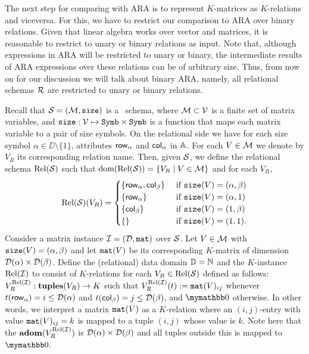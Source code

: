 The next step for comparing \langsum with ARA is to represent $K$-matrices as $K$-relations and viceversa. For this, we have to restrict our comparison to ARA over binary relations. Given that linear algebra works over vector and matrices, it is reasonable to restrict to unary or binary relations as input. Note that, although expressions in ARA will be restricted to unary or binary, the intermediate results of ARA expressions over these relations can be of arbitrary size. Thus, from now on for our discussion we will talk about binary ARA, namely, all relational schemas $\mathcal{R}$ are restricted to unary or binary relations. 

Recall that $\mathcal{S}=(\mathcal{M},\texttt{size})$ is a \lang\ schema, where $\mathcal{M}\subset \mathcal{V}$ is a finite set of matrix variables, and $\texttt{size}: \mathcal{V} \mapsto \texttt{Symb}\times \texttt{Symb}$ is a function that maps each matrix variable to a pair of size symbols. On the relational side
we have for each size symbol $\alpha\in\DD\setminus\{1\}$, attributes $\mathsf{row}_\alpha$ and $\mathsf{col}_\alpha$ in $\mathbb{A}$. For each $V\in\mathcal{M}$ we denote
by $V_R$ its corresponding relation name. Then, given $\mathcal{S}$, we define the relational schema $\text{Rel}(\mathcal{S})$ such that $\operatorname{dom}(\text{Rel}(\mathcal{S})) = \{V_R \mid V \in \mathcal{M}\}$ and for each $V_R$,
\[
\text{Rel}(\mathcal{S})(V_R) = \begin{cases}
\lbrace\mathsf{row}_\alpha,\mathsf{col}_\beta \rbrace & \text{ if $ \texttt{size}(V)=(\alpha,\beta)$} \\
\lbrace\mathsf{row}_\alpha \rbrace & \text{ if $ \texttt{size}(V)=(\alpha,1)$} \\
\lbrace\mathsf{col}_\beta \rbrace  &
\text{ if $ \texttt{size}(V)=(1,\beta)$} \\
\lbrace\rbrace & \text{ if $\texttt{size}(V)=(1,1)$}.
\end{cases}
\]
Consider a matrix instance $\mathcal{I} = (\mathcal{D},\texttt{mat})$ over $\mathcal{S}$.
Let $V\in\mathcal{M}$ with $\texttt{size}(V)=(\alpha,\beta)$ and let $\texttt{mat}(V)$ be its corresponding $K$-matrix of dimension $\mathcal{D}(\alpha)\times \mathcal{D}(\beta)$.
Define the (relational) data domain $\mathbb{D} = \mathbb{N}$ and the $K$-instance $\text{Rel}(\mathcal{I})$ to consist of $K$-relations for each $V_R\in \text{Rel}(\mathcal{S})$ defined as follows:
$V_R^{\text{Rel}(\mathcal{I})}: \mathbf{tuples}(V_R) \to K$ such that
$V_R^{\text{Rel}(\mathcal{I})}(t):=\texttt{mat}(V)_{ij}$ whenever $t(\mathsf{row}_\alpha) = i \leq \mathcal{D}(\alpha)$ and $t(\mathsf{col}_\beta) = j \leq \mathcal{D}(\beta)$, and $\kzero$ otherwise. In other words, we interpret a matrix $\texttt{mat}(V)$ as a $K$-relation where an $(i, j)$-entry with value $\texttt{mat}(V)_{ij} = k$ is mapped to a tuple $(i, j)$ whose value is $k$. Note here that the $\mathbf{adom}(V_R^{\text{Rel}(\mathcal{I})})$ is $\mathcal{D}(\alpha)\times \mathcal{D}(\beta)$ and all tuples outside this is mapped to $\kzero$. 


